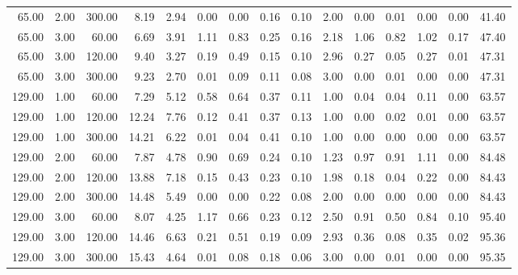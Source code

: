 \begin{table}[ht]
\begin{tabular}{rrrrrrrrrrrrrrr}
  65.00 & 2.00 & 300.00 & 8.19 & 2.94 & 0.00 & 0.00 & 0.16 & 0.10 & 2.00 & 0.00 & 0.01 & 0.00 & 0.00 & 41.40 \\ 
  65.00 & 3.00 & 60.00 & 6.69 & 3.91 & 1.11 & 0.83 & 0.25 & 0.16 & 2.18 & 1.06 & 0.82 & 1.02 & 0.17 & 47.40 \\ 
  65.00 & 3.00 & 120.00 & 9.40 & 3.27 & 0.19 & 0.49 & 0.15 & 0.10 & 2.96 & 0.27 & 0.05 & 0.27 & 0.01 & 47.31 \\ 
  65.00 & 3.00 & 300.00 & 9.23 & 2.70 & 0.01 & 0.09 & 0.11 & 0.08 & 3.00 & 0.00 & 0.01 & 0.00 & 0.00 & 47.31 \\ 
  129.00 & 1.00 & 60.00 & 7.29 & 5.12 & 0.58 & 0.64 & 0.37 & 0.11 & 1.00 & 0.04 & 0.04 & 0.11 & 0.00 & 63.57 \\ 
  129.00 & 1.00 & 120.00 & 12.24 & 7.76 & 0.12 & 0.41 & 0.37 & 0.13 & 1.00 & 0.00 & 0.02 & 0.01 & 0.00 & 63.57 \\ 
  129.00 & 1.00 & 300.00 & 14.21 & 6.22 & 0.01 & 0.04 & 0.41 & 0.10 & 1.00 & 0.00 & 0.00 & 0.00 & 0.00 & 63.57 \\ 
  129.00 & 2.00 & 60.00 & 7.87 & 4.78 & 0.90 & 0.69 & 0.24 & 0.10 & 1.23 & 0.97 & 0.91 & 1.11 & 0.00 & 84.48 \\ 
  129.00 & 2.00 & 120.00 & 13.88 & 7.18 & 0.15 & 0.43 & 0.23 & 0.10 & 1.98 & 0.18 & 0.04 & 0.22 & 0.00 & 84.43 \\ 
  129.00 & 2.00 & 300.00 & 14.48 & 5.49 & 0.00 & 0.00 & 0.22 & 0.08 & 2.00 & 0.00 & 0.00 & 0.00 & 0.00 & 84.43 \\ 
  129.00 & 3.00 & 60.00 & 8.07 & 4.25 & 1.17 & 0.66 & 0.23 & 0.12 & 2.50 & 0.91 & 0.50 & 0.84 & 0.10 & 95.40 \\ 
  129.00 & 3.00 & 120.00 & 14.46 & 6.63 & 0.21 & 0.51 & 0.19 & 0.09 & 2.93 & 0.36 & 0.08 & 0.35 & 0.02 & 95.36 \\ 
  129.00 & 3.00 & 300.00 & 15.43 & 4.64 & 0.01 & 0.08 & 0.18 & 0.06 & 3.00 & 0.00 & 0.01 & 0.00 & 0.00 & 95.35 \\ 
   \hline
\end{tabular}
\end{table}
